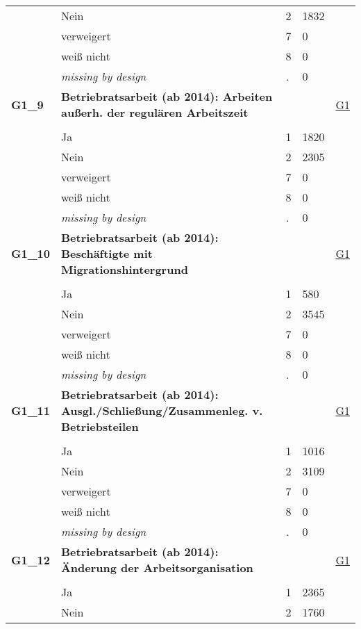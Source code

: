 \begin{longtable}{| L{2.65cm} | L{8cm} | C{1.5cm} | R{1.25cm} | C{2.25cm}  |}
   & Nein & 2 & 1832 &  \\ 
   & verweigert & 7 & 0 &  \\ 
   & weiß nicht & 8 & 0 &  \\ 
   & \textit{missing by design} & \textit{.} & 0 &  \\ 
   \midrule
\textbf{G1\_9}\label{var:G1:9} & \textbf{Betriebratsarbeit (ab 2014): Arbeiten außerh. der regulären Arbeitszeit} &  &  & \hyperref[G1]{G1} \\ 
   &  &  &  &  \\ 
   & Ja & 1 & 1820 &  \\ 
   & Nein & 2 & 2305 &  \\ 
   & verweigert & 7 & 0 &  \\ 
   & weiß nicht & 8 & 0 &  \\ 
   & \textit{missing by design} & \textit{.} & 0 &  \\ 
   \midrule
\textbf{G1\_10}\label{var:G1:10} & \textbf{Betriebratsarbeit (ab 2014): Beschäftigte mit Migrationshintergrund} &  &  & \hyperref[G1]{G1} \\ 
   &  &  &  &  \\ 
   & Ja & 1 & 580 &  \\ 
   & Nein & 2 & 3545 &  \\ 
   & verweigert & 7 & 0 &  \\ 
   & weiß nicht & 8 & 0 &  \\ 
   & \textit{missing by design} & \textit{.} & 0 &  \\ 
   \midrule
\textbf{G1\_11}\label{var:G1:11} & \textbf{Betriebratsarbeit (ab 2014): Ausgl./Schließung/Zusammenleg. v. Betriebsteilen} &  &  & \hyperref[G1]{G1} \\ 
   &  &  &  &  \\ 
   & Ja & 1 & 1016 &  \\ 
   & Nein & 2 & 3109 &  \\ 
   & verweigert & 7 & 0 &  \\ 
   & weiß nicht & 8 & 0 &  \\ 
   & \textit{missing by design} & \textit{.} & 0 &  \\ 
   \midrule
\textbf{G1\_12}\label{var:G1:12} & \textbf{Betriebratsarbeit (ab 2014): Änderung der Arbeitsorganisation} &  &  & \hyperref[G1]{G1} \\ 
   &  &  &  &  \\ 
   & Ja & 1 & 2365 &  \\ 
   & Nein & 2 & 1760 &  \\ 

\end{longtable}

